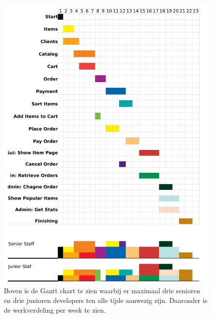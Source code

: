 \documentclass[•]{article}
\begin{document}
\begin{figure}
\centering
\includegraphics[width=13.5cm]{maxStaffPlanning.jpg}
\caption{Boven is de Gantt chart te zien waarbij er maximaal drie senioren en drie junioren developers ten alle tijde aanwezig zijn. Daaronder is de werkverdeling per week te zien.}
\label{maxGantt}
\end{figure}
\end{document}
